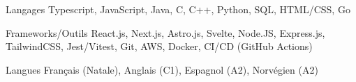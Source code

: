 
\begin{cvskills}
  \cvskill
    {Langages} %
    {Typescript, JavaScript, Java, C, C++, Python, SQL, HTML/CSS, Go} %

  \cvskill
    {Frameworks/Outils} %
    {React.js, Next.js, Astro.js, Svelte, Node.JS, Express.js, TailwindCSS, Jest/Vitest, Git, AWS, Docker, CI/CD (GitHub Actions)} %
    
  \cvskill
    {Langues} %
    {Français (Natale), Anglais (C1), Espagnol (A2), Norvégien (A2)} %
    
\end{cvskills}
